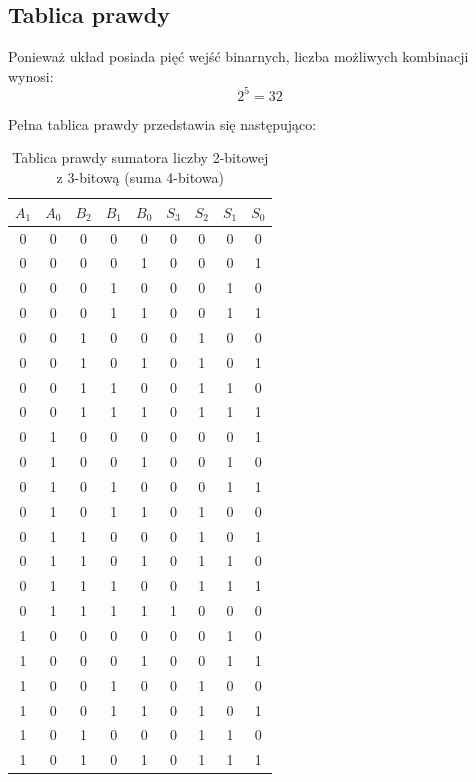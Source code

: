 \documentclass[11pt]{article}
\begin{document}
\subsection{Tablica prawdy}

Ponieważ układ posiada pięć wejść binarnych, liczba możliwych kombinacji wynosi:
\begin{equation}
2^5 = 32
\end{equation}

Pełna tablica prawdy przedstawia się następująco:
\begin{table}[H]
\centering
\caption{Tablica prawdy sumatora liczby 2-bitowej z 3-bitową (suma 4-bitowa)}
\label{tab:tablica_prawdy}
\setlength{\tabcolsep}{6pt}
\begin{tabular}{ccccc|cccc}
\hline
\(A_1\) & \(A_0\) & \(B_2\) & \(B_1\) & \(B_0\) & \(S_3\) & \(S_2\) & \(S_1\) & \(S_0\) \\
\hline
0 & 0 & 0 & 0 & 0 & 0 & 0 & 0 & 0 \\
0 & 0 & 0 & 0 & 1 & 0 & 0 & 0 & 1 \\
0 & 0 & 0 & 1 & 0 & 0 & 0 & 1 & 0 \\
0 & 0 & 0 & 1 & 1 & 0 & 0 & 1 & 1 \\
0 & 0 & 1 & 0 & 0 & 0 & 1 & 0 & 0 \\
0 & 0 & 1 & 0 & 1 & 0 & 1 & 0 & 1 \\
0 & 0 & 1 & 1 & 0 & 0 & 1 & 1 & 0 \\
0 & 0 & 1 & 1 & 1 & 0 & 1 & 1 & 1 \\
0 & 1 & 0 & 0 & 0 & 0 & 0 & 0 & 1 \\
0 & 1 & 0 & 0 & 1 & 0 & 0 & 1 & 0 \\
0 & 1 & 0 & 1 & 0 & 0 & 0 & 1 & 1 \\
0 & 1 & 0 & 1 & 1 & 0 & 1 & 0 & 0 \\
0 & 1 & 1 & 0 & 0 & 0 & 1 & 0 & 1 \\
0 & 1 & 1 & 0 & 1 & 0 & 1 & 1 & 0 \\
0 & 1 & 1 & 1 & 0 & 0 & 1 & 1 & 1 \\
0 & 1 & 1 & 1 & 1 & 1 & 0 & 0 & 0 \\
1 & 0 & 0 & 0 & 0 & 0 & 0 & 1 & 0 \\
1 & 0 & 0 & 0 & 1 & 0 & 0 & 1 & 1 \\
1 & 0 & 0 & 1 & 0 & 0 & 1 & 0 & 0 \\
1 & 0 & 0 & 1 & 1 & 0 & 1 & 0 & 1 \\
1 & 0 & 1 & 0 & 0 & 0 & 1 & 1 & 0 \\
1 & 0 & 1 & 0 & 1 & 0 & 1 & 1 & 1 \\

\end{tabular}
\end{table}
\end{document}
